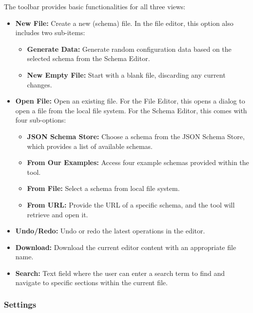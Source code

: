 The toolbar provides basic functionalities for all three views:
\begin{itemize}
    \item \textbf{New File:} Create a new (schema) file.
    In the file editor, this option also includes two sub-items:
    \begin{itemize}
        \item \textbf{Generate Data:} Generate random configuration data based on the selected schema from the Schema Editor.
        \item \textbf{New Empty File:} Start with a blank file, discarding any current changes.
    \end{itemize}

    \item \textbf{Open File:} Open an existing file.
    For the File Editor, this opens a dialog to open a file from the local file system.
    For the Schema Editor, this comes with four sub-options:
    \begin{itemize}
        \item \textbf{JSON Schema Store:} Choose a schema from the JSON Schema Store, which provides a list of available schemas.

        \item \textbf{From Our Examples:} Access four example schemas provided within the tool.

        \item \textbf{From File:} Select a schema from local file system.

        \item \textbf{From URL:} Provide the URL of a specific schema, and the tool will retrieve and open it.

    \end{itemize}
    \item \textbf{Undo/Redo:} Undo or redo the latest operations in the editor.
    \item \textbf{Download:} Download the current editor content with an appropriate file name.
    \item \textbf{Search:} Text field where the user can enter a search term to find and navigate to specific sections within the current file.
\end{itemize}


\subsubsection{Settings}

